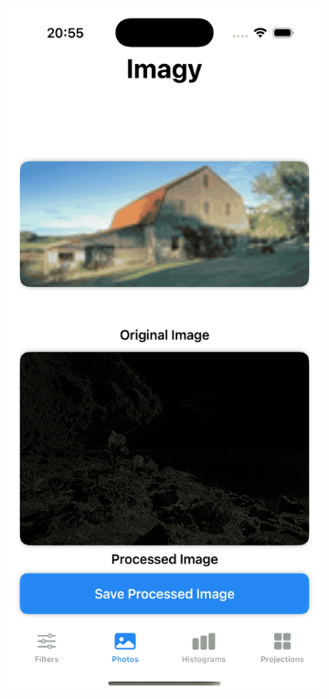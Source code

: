 \documentclass[a4paper]{article}
\begin{document}
\begin{figure}[H]
\begin{subfigure}{0.2\textwidth}
        \label{fig:dog_robert_cross}
    \end{subfigure}
    \hfill
    \begin{subfigure}{0.2\textwidth}
        \centering
        \includegraphics[width=\linewidth]{images/barn_robert_cross.png}

\end{subfigure}
\end{figure}
\end{document}

